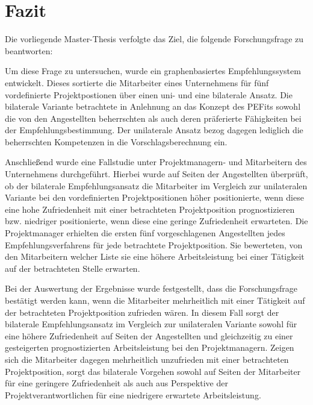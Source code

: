 \chapter{Fazit}
\label{ch:fazit}
Die vorliegende Master-Thesis verfolgte das Ziel, die folgende Forschungsfrage zu beantworten: \forschungsfrage

Um diese Frage zu untersuchen, wurde ein graphenbasiertes Empfehlungssystem  entwickelt. Dieses sortierte die Mitarbeiter eines Unternehmens für fünf vordefinierte Projektpostionen über einen uni- und eine bilaterale Ansatz. Die bilaterale Variante betrachtete in Anlehnung an das Konzept des \aclp{PEFit} sowohl die von den Angestellten beherrschten als auch deren präferierte Fähigkeiten bei der Empfehlungsbestimmung. Der unilaterale Ansatz bezog dagegen lediglich die beherrschten Kompetenzen in die Vorschlagsberechnung ein.

Anschließend wurde eine Fallstudie unter Projektmanagern- und Mitarbeitern des Unternehmens durchgeführt. Hierbei wurde auf Seiten der Angestellten überprüft, ob der bilaterale Empfehlungsansatz die Mitarbeiter im Vergleich zur unilateralen Variante bei den vordefinierten Projektpositionen höher positionierte, wenn diese eine hohe Zufriedenheit mit einer betrachteten Projektposition prognostizieren bzw. niedriger positionierte, wenn diese eine geringe Zufriedenheit erwarteten. Die Projektmanager erhielten die ersten fünf vorgeschlagenen Angestellten jedes Empfehlungsverfahrens für jede betrachtete Projektposition. Sie bewerteten, von den Mitarbeitern welcher Liste sie eine höhere Arbeitsleistung bei einer Tätigkeit auf der betrachteten Stelle erwarten.

Bei der Auswertung der Ergebnisse wurde festgestellt, dass die Forschungsfrage bestätigt werden kann, wenn die Mitarbeiter mehrheitlich mit einer Tätigkeit auf der betrachteten Projektposition zufrieden wären. In diesem Fall sorgt der bilaterale Empfehlungsansatz im Vergleich zur unilateralen Variante sowohl für eine höhere Zufriedenheit auf Seiten der Angestellten und gleichzeitig zu einer gesteigerten prognostizierten Arbeitsleistung bei den Projektmanagern. Zeigen sich die Mitarbeiter dagegen mehrheitlich unzufrieden mit einer betrachteten Projektposition, sorgt das bilaterale Vorgehen sowohl auf Seiten der Mitarbeiter für eine geringere Zufriedenheit als auch aus Perspektive der Projektverantwortlichen für eine niedrigere erwartete Arbeitsleistung.

